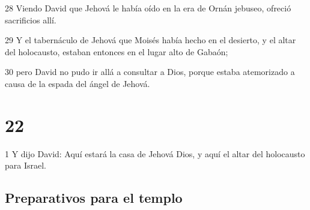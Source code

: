 \par 28 Viendo David que Jehová le había oído en la era de Ornán jebuseo, ofreció sacrificios allí.
\par 29 Y el tabernáculo de Jehová que Moisés había hecho en el desierto, y el altar del holocausto, estaban entonces en el lugar alto de Gabaón;
\par 30 pero David no pudo ir allá a consultar a Dios, porque estaba atemorizado a causa de la espada del ángel de Jehová.

\chapter{22}

\par 1 Y dijo David: Aquí estará la casa de Jehová Dios, y aquí el altar del holocausto para Israel.

\section*{Preparativos para el templo}


